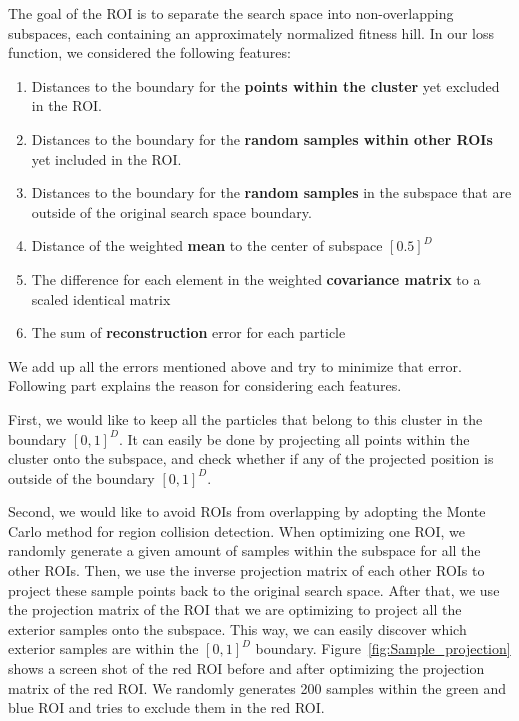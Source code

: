 The goal of the ROI is to separate the search space into non-overlapping subspaces, 
each containing an approximately normalized fitness hill.
In our loss function, we considered the following features:
\begin{enumerate}
    \item Distances to the boundary for the \textbf{points within the cluster} yet excluded in the ROI.
    \item Distances to the boundary for the \textbf{random samples within other ROIs} yet included in the ROI.
    \item Distances to the boundary for the \textbf{random samples} in the subspace that are outside of the original search space boundary.
    \item Distance of the weighted \textbf{mean} to the center of subspace $[0.5]^D$
    \item The difference for each element in the weighted \textbf{covariance matrix} to a scaled identical matrix
    \item The sum of \textbf{reconstruction} error for each particle 
\end{enumerate} 
We add up all the errors mentioned above and try to minimize that error. 
Following part explains the reason for considering each features.

First, we would like to keep all the particles that belong to this cluster in the boundary $[0,1]^D$.
It can easily be done by projecting all points within the cluster onto the subspace, 
and check whether if any of the projected position is outside of the boundary $[0,1]^D$.

Second, we would like to avoid ROIs from overlapping by adopting the Monte Carlo method for region collision detection. 
When optimizing one ROI, we randomly generate a given amount of samples within the subspace for all the other ROIs.
Then, we use the inverse projection matrix of each other ROIs to project these sample points back to the original search space.
After that, we use the projection matrix of the ROI that we are optimizing to project all the exterior samples onto the subspace.
This way, we can easily discover which exterior samples are within the $[0, 1]^D$ boundary.
Figure~\ref{fig:Sample_projection} shows a screen shot of the red ROI before and after optimizing the projection matrix of the red ROI.
We randomly generates 200 samples within the green and blue ROI and tries to exclude them in the red ROI.

